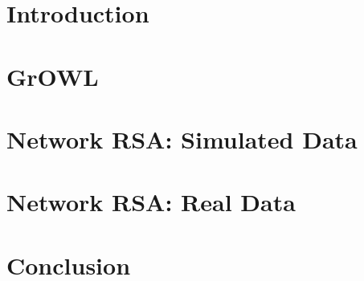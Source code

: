 \documentclass[journal]{IEEEtran}
\begin{document}
	
	\IEEEpeerreviewmaketitle
	
	
	
	\section{Introduction}
	
	
	\section{GrOWL}
	\label{Sec:growl}
	
	
	\section{Network RSA: Simulated Data}
        \label{wbrsa1}
	
	
	\section{Network RSA: Real Data}
        \label{wbrsa2}
	
	
	\section{Conclusion}
	
\end{document}
